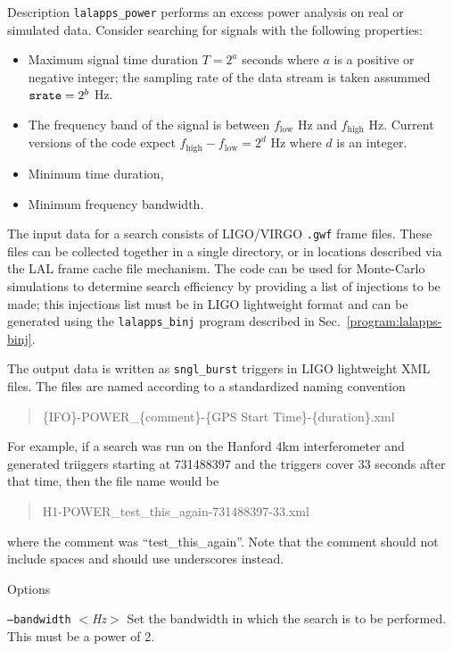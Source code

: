 \documentclass{article}
\newcommand{\prog}[1]{\texttt{#1}}
\newcommand{\option}[1]{\texttt{#1}}
\newcommand{\parm}[1]{$<$\textit{#1}$>$}
\newenvironment{entry}%
  {\begin{list}{}{\renewcommand{\makelabel}[1]%
    {\parbox[b]{\labelwidth}{\makebox[0pt][l]{\textbf{##1}}\\}}%
    \setlength{\labelwidth}{1em}%
    \setlength{\labelsep}{1em}%
    \setlength{\leftmargin}{2em}%
    \setlength{\topsep}{\medskipamount}%
    \setlength{\itemsep}{\medskipamount}%
    \setlength{\parsep}{\medskipamount}%
    \setlength{\listparindent}{0pt}}}
  {\end{list}}
\begin{document}
\begin{entry}
\item[Description] 
\prog{lalapps\_power} performs an excess power analysis on real or
simulated data.  Consider searching for signals with the following
properties:
\begin{itemize}
\item Maximum signal time duration $T=2^a$ seconds where $a$ is a positive
or negative integer;  the sampling rate of the data stream is taken
assummed $\mbox{\texttt{srate}} = 2^b$ Hz.

\item The frequency band of the signal is between $f_{\mathrm{low}}$ Hz and
${f_{\mathrm{high}}}$ Hz.  Current versions of the code expect
${f_{\mathrm{high}}}-{f_{\mathrm{low}}}=2^d$ Hz where $d$ is an integer. 

\item Minimum time duration,

\item Minimum frequency bandwidth.
\end{itemize}

The input data for a search consists of LIGO/VIRGO \texttt{.gwf} frame
files.  These files can be collected together in a single directory, or in
locations described via the LAL frame cache file mechanism.  The code can
be used for Monte-Carlo simulations to determine search efficiency by
providing a list of injections to be made;  this injections list must be in
LIGO lightweight format and can be generated using the \prog{lalapps\_binj}
program described in Sec.~\ref{program:lalapps-binj}. 

The output data is written as \verb|sngl_burst| triggers in LIGO
lightweight XML files.  The files are named according to a standardized
naming convention
\begin{quote}
\{IFO\}-POWER\_\{comment\}-\{GPS Start Time\}-\{duration\}.xml
\end{quote}
For example, if a search was run on the Hanford 4km interferometer and
generated triiggers starting at 731488397 and the triggers cover 33 seconds
after that time,  then the file name would be 
\begin{quote}
H1-POWER\_test\_this\_again-731488397-33.xml
\end{quote}
where the comment was ``test\_this\_again''.  Note that the comment should
not include spaces and should use underscores instead.

\item[Options]\leavevmode
\begin{entry}
\item[\option{--bandwidth} \parm{Hz}]
Set the bandwidth in which the search is to be performed.  This must be a
power of 2.


\end{entry}
\end{entry}
\end{document}
